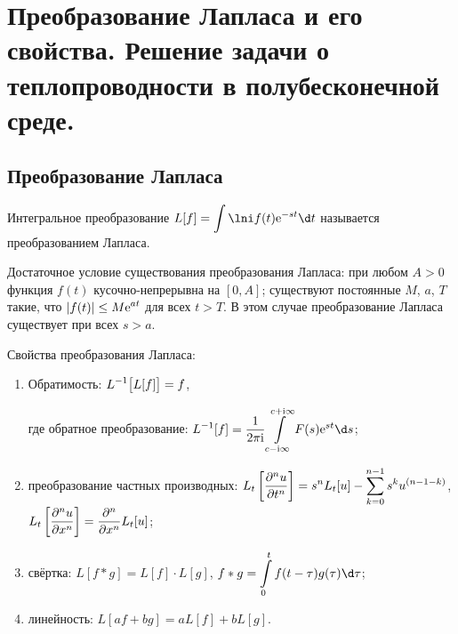 \chapter{Преобразование Лапласа и его свойства. Решение задачи о
теплопроводности в полубесконечной среде.}

\section{Преобразование Лапласа}
Интегральное преобразование \( \ds L[f] = \int\lni f(t)\e^{-st}\d t \)
называется преобразованием Лапласа.

Достаточное условие существования преобразования Лапласа: при любом \( A > 0 \)
функция \( f(t) \) кусочно-непрерывна на \( [0, A] \); существуют постоянные \( M \), \( a \), \( T \)
такие, что \( \displaystyle |f(t)| \le M\mathrm{e}^{at} \) для всех \( t > T \). В этом случае
преобразование Лапласа существует при всех \( s > a \).

Свойства преобразования Лапласа:
\begin{enumerate}
    \item Обратимость: \( \displaystyle L^{-1}\bigl[L[f]\bigr] = f \),
    
    где обратное преобразование: \( \ds L^{-1}[f] = \frac{1}{2\pi\i}
    \int\limits_{c-\i\infty}^{c+\i\infty} F(s)\e^{st}\d s \);
    
    \item преобразование частных производных:
    \( \displaystyle L_t\left[\frac{\partial^{n} u}{\partial t^{n}}\right] = s^nL_t[u] - \sum\limits_{k=0}^{n-1}
    s^k u^{(n - 1 - k)} \),
    \( \displaystyle L_t\left[\frac{\partial^{n} u}{\partial x^{n}}\right] = \frac{\partial^{n} }{\partial x^{n}}L_t[u] \);
    
    \item свёртка: \( L[f*g] = L[f]\cdot L[g] \),
    \( \ds f*g = \int\limits_0^t f(t-\tau)g(\tau)\d\tau \);
    
    \item линейность: \( L[af + bg] = aL[f] + bL[g] \).
\end{enumerate}


